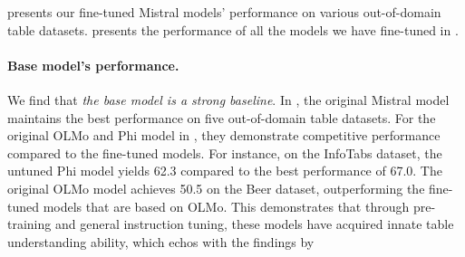 \documentclass[11pt]{article}
\newcommand{\patricng}[1]{\textcolor{teal}{[PN: #1]}}
\begin{document}
 presents our fine-tuned Mistral models' performance on various out-of-domain table datasets.
 presents the performance of all the models we have fine-tuned in .



\paragraph{Base model's performance.}
We find that \textit{the base model is a strong baseline}.
In , the original Mistral model maintains the best performance on five out-of-domain table datasets.
For the original OLMo and Phi model in , they demonstrate competitive performance compared to the fine-tuned models.
For instance, on the InfoTabs dataset, the untuned Phi model yields 62.3 compared to the best performance of 67.0. 
The original OLMo model achieves 50.5 on the Beer dataset, outperforming the fine-tuned models that are based on OLMo.
This demonstrates that through pre-training and general instruction tuning, these models have acquired innate table understanding ability, which echos with the findings by \citet{li2023table,deng-etal-2024-tables}
\end{document}
